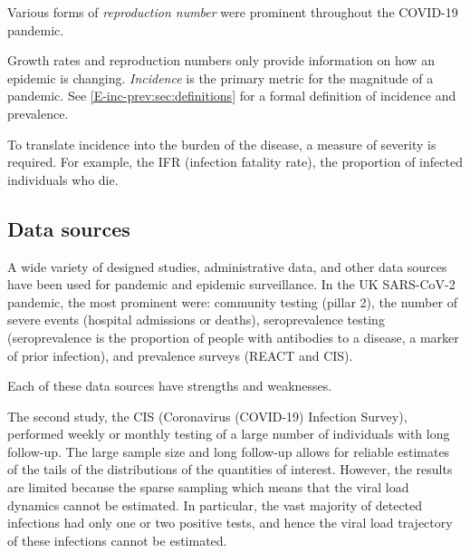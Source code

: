 \documentclass[thesis.tex]{subfiles}
\begin{document}
Various forms of \emph{reproduction number} were prominent throughout the COVID-19 pandemic.


Growth rates and reproduction numbers only provide information on how an epidemic is changing.
\emph{Incidence} is the primary metric for the magnitude of a pandemic.
See \cref{E-inc-prev:sec:definitions} for a formal definition of incidence and prevalence.



To translate incidence into the burden of the disease, a measure of severity is required.
For example, the IFR (infection fatality rate), the proportion of infected individuals who die.

\subsection{Data sources}

A wide variety of designed studies, administrative data, and other data sources have been used for pandemic and epidemic surveillance.
In the UK SARS-CoV-2 pandemic, the most prominent were: community testing (pillar 2), the number of severe events (\eg hospital admissions or deaths), seroprevalence testing (seroprevalence is the proportion of people with antibodies to a disease, a marker of prior infection), and prevalence surveys (\eg REACT and CIS).

Each of these data sources have strengths and weaknesses.

The second study, the CIS (Coronavirus (COVID-19) Infection Survey), performed weekly or monthly testing of a large number of individuals with long follow-up.
The large sample size and long follow-up allows for reliable estimates of the tails of the distributions of the quantities of interest.
However, the results are limited because the sparse sampling which means that the viral load dynamics cannot be estimated.
In particular, the vast majority of detected infections had only one or two positive tests, and hence the viral load trajectory of these infections cannot be estimated.
\end{document}
